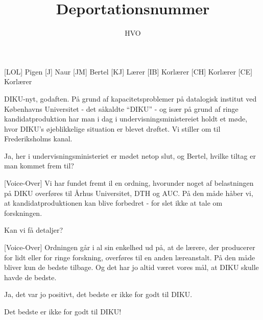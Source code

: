 \documentclass[a4paper,11pt]{article}
\title{Deportationsnummer}
\author{HVO}
\begin{document}
\maketitle

\begin{roles}
[LOL] Pigen
[J] Naur
[JM] Bertel
[KJ] Lærer
[IB] Korlærer
[CH] Korlærer
[CE] Korlærer
\end{roles}

\begin{sketch}


 DIKU-nyt, godaften.  På grund af kapacitetsproblemer på datalogisk institut ved Københavns Universitet - det såkaldte ``DIKU'' - og især på grund af ringe kandidatproduktion har man i dag i undervisningsministereiet holdt et møde, hvor DIKU's øjeblikkelige situation er blevet drøftet.  Vi stiller om til Frederiksholms kanal. 

 Ja, her i undervisningsministeriet er mødet netop slut, og Bertel, hvilke tiltag er man kommet frem til?

[Voice-Over] Vi har fundet fremt il en ordning, hvorunder noget af belastningen på DIKU overføres til Århus Universitet, DTH og AUC.  På den måde håber vi, at kandidatproduktionen kan blive forbedret - for slet ikke at tale om forskningen.

 Kan vi få detaljer?

[Voice-Over] Ordningen går i al sin enkelhed ud på, at de lærere, der producerer for lidt eller for ringe forskning, overføres til en anden læreanstalt.  På den måde bliver kun de bedste tilbage.  Og det har jo altid været vores mål, at DIKU skulle havde de bedste.

 Ja, det var jo positivt, det bedste er ikke for godt til DIKU.

 Det bedste er ikke for godt til DIKU!


\end{sketch}
\end{document}
